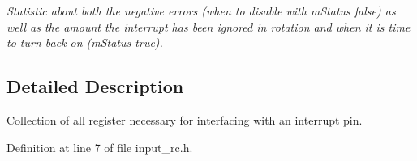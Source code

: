 \begin{DoxyCompactItemize}
\begin{DoxyCompactList}\small\item\em Statistic about both the negative errors (when to disable with m\+Status false) as well as the amount the interrupt has been ignored in rotation and when it is time to turn back on (m\+Status true). \end{DoxyCompactList}\end{DoxyCompactItemize}


\subsection{Detailed Description}
Collection of all register necessary for interfacing with an interrupt pin. 

Definition at line 7 of file input\+\_\+rc.\+h.

